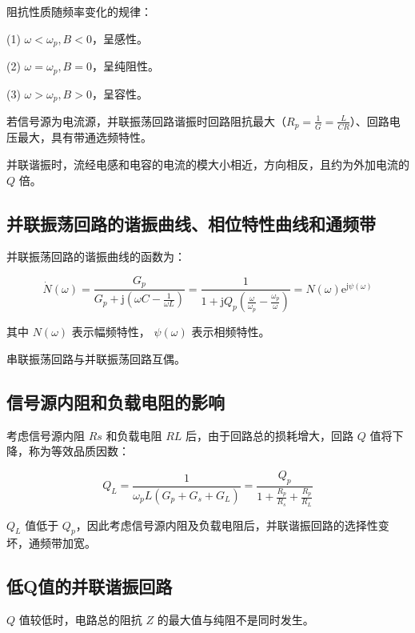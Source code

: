 阻抗性质随频率变化的规律：

(1) $\omega < \omega_p, B < 0$，呈感性。

(2) $\omega = \omega_p, B = 0$，呈纯阻性。

(3) $\omega > \omega_p, B > 0$，呈容性。

若信号源为电流源，并联振荡回路谐振时回路阻抗最大（$R_p = \frac{1}{G} = \frac{L}{CR}$）、回路电压最大，具有带通选频特性。

并联谐振时，流经电感和电容的电流的模大小相近，方向相反，且约为外加电流的 $Q$ 倍。

\subsection{并联振荡回路的谐振曲线、相位特性曲线和通频带}

并联振荡回路的谐振曲线的函数为：

\begin{equation}
    \dot{N}(\omega) = \frac{G_p}{G_p + \text{j}(\omega C - \frac{1}{\omega L})} = \frac{1}{1 + \text{j} Q_p \left( \frac{\omega}{\omega_p} - \frac{\omega_p}{\omega} \right) } = N(\omega) \text{e}^{\text{j} \psi(\omega)}
\end{equation}

其中 $N(\omega)$ 表示幅频特性， $\psi(\omega)$ 表示相频特性。

串联振荡回路与并联振荡回路互偶。

\subsection{信号源内阻和负载电阻的影响}

考虑信号源内阻 $Rs$ 和负载电阻 $RL$ 后，由于回路总的损耗增大，回路 $Q$ 值将下降，称为等效品质因数：

\begin{equation}
    Q_L = \frac{1}{\omega_p L \left( G_p + G_s + G_L \right) }
    = \frac{Q_p}{1 + \frac{R_p}{R_s} + \frac{R_p}{R_L}}
\end{equation}

$Q_L$ 值低于 $Q_p$，因此考虑信号源内阻及负载电阻后，并联谐振回路的选择性变坏，通频带加宽。

\subsection{低Q值的并联谐振回路}

$Q$ 值较低时，电路总的阻抗 $Z$ 的最大值与纯阻不是同时发生。

